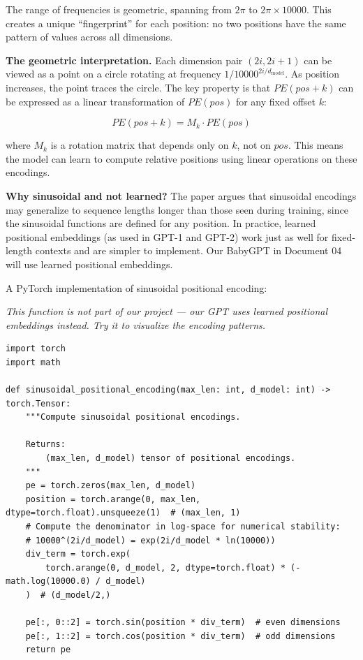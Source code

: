 The range of frequencies is geometric, spanning from $2\pi$ to $2\pi \times 10000$. This creates a unique ``fingerprint'' for each position: no two positions have the same pattern of values across all dimensions.

\textbf{The geometric interpretation.} Each dimension pair $(2i, 2i+1)$ can be viewed as a point on a circle rotating at frequency $1/10000^{2i/d_{\text{model}}}$. As position increases, the point traces the circle. The key property is that $PE(pos + k)$ can be expressed as a linear transformation of $PE(pos)$ for any fixed offset $k$:

\[PE(pos + k) = M_k \cdot PE(pos)\]

where $M_k$ is a rotation matrix that depends only on $k$, not on $pos$. This means the model can learn to compute relative positions using linear operations on these encodings.

\textbf{Why sinusoidal and not learned?} The paper argues that sinusoidal encodings may generalize to sequence lengths longer than those seen during training, since the sinusoidal functions are defined for any position. In practice, learned positional embeddings (as used in GPT-1 and GPT-2) work just as well for fixed-length contexts and are simpler to implement. Our BabyGPT in Document 04 will use learned positional embeddings.

A PyTorch implementation of sinusoidal positional encoding:

\demotag
{\small\itshape This function is not part of our project --- our GPT uses learned positional embeddings instead. Try it to visualize the encoding patterns.}
\begin{lstlisting}
import torch
import math

def sinusoidal_positional_encoding(max_len: int, d_model: int) -> torch.Tensor:
    """Compute sinusoidal positional encodings.

    Returns:
        (max_len, d_model) tensor of positional encodings.
    """
    pe = torch.zeros(max_len, d_model)
    position = torch.arange(0, max_len, dtype=torch.float).unsqueeze(1)  # (max_len, 1)
    # Compute the denominator in log-space for numerical stability:
    # 10000^(2i/d_model) = exp(2i/d_model * ln(10000))
    div_term = torch.exp(
        torch.arange(0, d_model, 2, dtype=torch.float) * (-math.log(10000.0) / d_model)
    )  # (d_model/2,)

    pe[:, 0::2] = torch.sin(position * div_term)  # even dimensions
    pe[:, 1::2] = torch.cos(position * div_term)  # odd dimensions
    return pe
\end{lstlisting}

